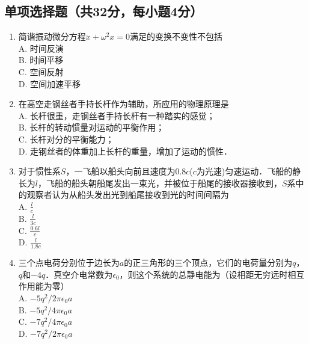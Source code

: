 
\begin{issues}
\issueDraft
\issueTODO
\end{issues}



\subsection{单项选择题（共32分，每小题4分）}
\begin{enumerate}
\item 简谐振动微分方程$\ddot{x}+{\omega}^2{x}=0$满足的变换不变性不包括\\
A. 时间反演\\
B. 时间平移\\
C. 空间反射\\
D. 空间加速平移\\

\item 在高空走钢丝者手持长杆作为辅助，所应用的物理原理是\\
A. 长杆很重，走钢丝者手持长杆有一种踏实的感觉；\\
B. 长杆的转动惯量对运动的平衡作用；\\
C. 长杆对分的平衡能力；\\
D. 走钢丝者的体重加上长杆的重量，增加了运动的惯性．\\

\item 对于惯性系$S$，一飞船以船头向前且速度为0.8$c$($c$为光速)匀速运动．飞船的静长为$l$，飞船的船头朝船尾发出一束光，并被位于船尾的接收器接收到，$S$系中的观察者认为从船头发出光到船尾接收到光的时间间隔为\\
A. $\frac{l}{c}$\\
B. $\frac{l}{3c}$\\
C. $\frac{0.6l}{c}$\\
D. $\frac{l}{1.8c}$\\

\item 三个点电荷分别位于边长为$a$的正三角形的三个顶点，它们的电荷量分别为$q$，$q$和$-4q$．真空介电常数为$\epsilon_{0}$，则这个系统的总静电能为（设相距无穷远时相互作用能为零）\\
A. $-5q^{2}/2\pi \epsilon_{0} a$\\
B. $-5q^{2}/4\pi \epsilon_{0} a$\\
C. $-7q^{2}/4\pi \epsilon_{0} a$\\
D. $-7q^{2}/2\pi \epsilon_{0} a$\\


\end{enumerate}
